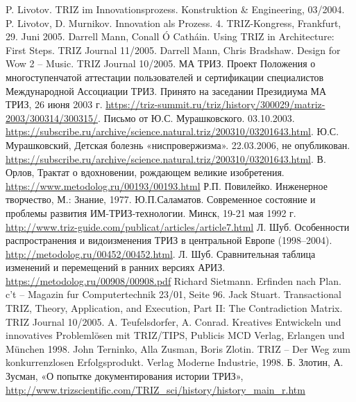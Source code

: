 \begin{thebibliography}{xxx}
 P. Livotov. TRIZ im Innovationsprozess. Konstruktion \&
  Engineering, 03/2004.
 P. Livotov, D. Murnikov. Innovation als Prozess. 
  4. TRIZ-Kongress, Frankfurt, 29. Juni 2005. 
 Darrell Mann, Conall Ó Catháin.  Using TRIZ in
  Architecture: First Steps. TRIZ Journal 11/2005.
 Darrell Mann, Chris Bradshaw. Design for Wow 2 – Music.
  TRIZ Journal 10/2005.
 МА ТРИЗ. Проект Положения о многоступенчатой аттестации
  пользователей и сертификации специалистов Международной Ассоциации ТРИЗ.
  Принято на заседании Президиума МА ТРИЗ, 26 июня 2003 г.
  \url{https://triz-summit.ru/triz/history/300029/matriz-2003/300314/300315/}.
 Письмо от Ю.С. Мурашковского. 03.10.2003.
  \url{https://subscribe.ru/archive/science.natural.triz/200310/03201643.html}.
 Ю.С. Мурашковский, Детская болезнь
  «ниспровержизма». 22.03.2006, не опубликован.
  \url{https://subscribe.ru/archive/science.natural.triz/200310/03201643.html}.
 В. Орлов, Трактат о вдохновении, рождающем великие
  изобретения.  \url{https://www.metodolog.ru/00193/00193.html}
 Р.П. Повилейко. Инженерное творчество, М.: Знание,
  1977.
 Ю.П.Саламатов. Современное состояние и проблемы
  развития ИМ-ТРИЗ-технологии. Минск, 19-21 мая 1992 г.
  \url{http://www.triz-guide.com/publicat/articles/article7.html}
 Л. Шуб. Особенности распространения и видоизменения ТРИЗ в
  центральной Европе (1998--2004).
  \url{http://metodolog.ru/00452/00452.html}.
 Л. Шуб. Сравнительная таблица изменений и перемещений в
  ранних версиях АРИЗ. \url{https://metodolog.ru/00908/00908.pdf}
 Richard Sietmann. Erfinden nach Plan. c't -- Magazin
  fur Computertechnik 23/01, Seite 96.
 Jack Stuart. Transactional TRIZ, Theory, Application, and
  Execution, Part II: The Contradiction Matrix. TRIZ Journal 10/2005.
 A. Teufelsdorfer, A.  Conrad. Kreatives Entwickeln
  und innovatives Problemlösen mit TRIZ/TIPS, Publicis MCD Verlag, Erlangen
  und München 1998.
 John Terninko, Alla Zusman, Boris Zlotin. TRIZ -- Der
  Weg zum konkurrenzlosen Erfolgsprodukt. Verlag Moderne Industrie, 1998.
 Б. Злотин, А. Зусман, «О попытке документирования
  истории ТРИЗ»,
  \url{http://www.trizscientific.com/TRIZ_sci/history/history_main_r.htm}
\end{thebibliography}

